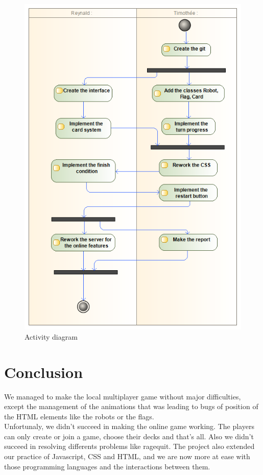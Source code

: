 \documentclass[a4paper, 10pt, oneside]{article}
\begin{document}
	\begin{figure}[h]
		\centering
		\includegraphics[scale=0.4]{img/activity.png}
		\caption{Activity diagram}
		\label{fig:Activity}
	\end{figure}
	
\newpage
\section{Conclusion}
	We managed to make the local multiplayer game without major difficulties, except the management of the animations that was leading to bugs of position of the HTML elements like the robots or the flags.\\
	Unfortunaly, we didn't succeed in making the online game working. The players can only create or join a game, choose their decks and that's all. Also we didn't succeed in resolving differents problems like ragequit.
	The project also extended our practice of Javascript, CSS and HTML, and we are now more at ease with those programming languages and the interactions between them.
\end{document}
